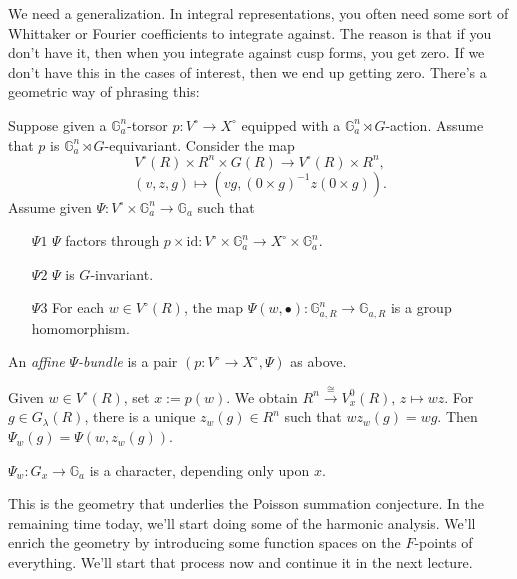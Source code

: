 \documentclass[reqno]{amsart} 
\numberwithin{theorem}{section}
\numberwithin{equation}{section}
\numberwithin{exercise}{section}
\begin{document}
We need a generalization.  In integral representations, you often need some sort of Whittaker or Fourier coefficients to integrate against.  The reason is that if you don't have it, then when you integrate against cusp forms, you get zero.  If we don't have this in the cases of interest, then we end up getting zero.  There's a geometric way of phrasing this:
\begin{definition}\label{definition:cq6tho7nvw}
  Suppose given a $\mathbb{G}_a^n$-torsor $p : V^{\circ} \rightarrow X^{\circ}$ equipped with a $\mathbb{G}_a^n \rtimes G$-action.  Assume that $p$ is $\mathbb{G}_a^n \rtimes G$-equivariant.  Consider the map
  \begin{equation*}
    V^{\circ}(R) \times R^n \times G(R) \rightarrow V^{\circ}(R) \times R^n,
  \end{equation*}
  \begin{equation*}
    (v, z, g) \mapsto(v g,(0 \times g)^{-1} z(0 \times g)).
  \end{equation*}
  Assume given $\Psi : V^{\circ} \times \mathbb{G}_a^n \rightarrow \mathbb{G}_a$ such that
  \begin{enumerate}
  \item [$\Psi 1$] $\Psi$ factors through $p \times \mathrm{id} : V^{\circ} \times \mathbb{G}_a^n \rightarrow X^{\circ} \times \mathbb{G}_a^n$.
  \item [$\Psi 2$] $\Psi$ is $G$-invariant.
  \item [$\Psi 3$] For each $w \in V^{\circ}(R)$, the map $\Psi(w, \bullet) : \mathbb{G}_{a, R}^n \rightarrow \mathbb{G}_{a, R}$ is a group homomorphism.
  \end{enumerate}
  An \emph{affine} $\Psi$\emph{-bundle} is a pair $(p : V^{\circ} \rightarrow X^{\circ}, \Psi)$ as above.
\end{definition}
Given $w \in V^{\circ}(R)$, set $x := p(w)$.  We obtain $R^n \xrightarrow{\cong} V_x^0(R)$, $z \mapsto w z$.  For $g \in G_\lambda(R)$, there is a unique $z_w(g) \in R^n$ such that $w z_w(g) = w g$.  Then $\Psi_w(g) = \Psi(w, z_w(g))$.
\begin{lemma}\label{lemma:cq6tho7lzu}
  $\Psi_w : G_x \rightarrow \mathbb{G}_a$ is a character, depending only upon $x$.
\end{lemma}

This is the geometry that underlies the Poisson summation conjecture.  In the remaining time today, we'll start doing some of the harmonic analysis.  We'll enrich the geometry by introducing some function spaces on the $F$-points of everything.  We'll start that process now and continue it in the next lecture.
\end{document}

